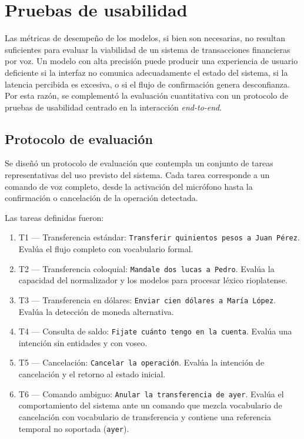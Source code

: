\section{Pruebas de usabilidad}
\label{sec:usabilidad}

Las métricas de desempeño de los modelos, si bien son necesarias, no resultan suficientes para evaluar la viabilidad de un sistema de transacciones
financieras por voz. Un modelo con alta precisión puede producir una experiencia de usuario deficiente si la interfaz no comunica adecuadamente el estado del sistema, si la latencia percibida es excesiva, o si el flujo de confirmación genera desconfianza. Por esta razón, se complementó la evaluación cuantitativa con un protocolo de pruebas de usabilidad centrado en la interacción
\textit{end-to-end}.

\subsection{Protocolo de evaluación}
\label{subsec:protocolo-usabilidad}

Se diseñó un protocolo de evaluación que contempla un conjunto de tareas representativas del uso previsto del sistema. Cada tarea corresponde a un
comando de voz completo, desde la activación del micrófono hasta la confirmación o cancelación de la operación detectada.

Las tareas definidas fueron:

\begin{enumerate}
    \item T1 --- Transferencia estándar: \texttt{Transferir quinientos pesos a Juan Pérez}. Evalúa el flujo completo con vocabulario formal.

    \item T2 --- Transferencia coloquial: \texttt{Mandale dos lucas a Pedro}. Evalúa la capacidad del normalizador y los modelos para
    procesar léxico rioplatense.

    \item T3 --- Transferencia en dólares: \texttt{Enviar cien dólares a María López}. Evalúa la detección de moneda alternativa.

    \item T4 --- Consulta de saldo: \texttt{Fijate cuánto tengo en la cuenta}. Evalúa una intención sin entidades y con voseo.

    \item T5 --- Cancelación: \texttt{Cancelar la operación}. Evalúa la intención de cancelación y el retorno al estado inicial.

    \item T6 --- Comando ambiguo: \texttt{Anular la transferencia de ayer}. Evalúa el comportamiento del sistema ante un comando que mezcla
    vocabulario de cancelación con vocabulario de transferencia y contiene una referencia temporal no soportada (\texttt{ayer}).
\end{enumerate}

